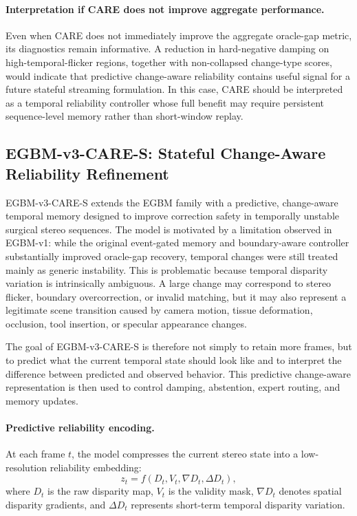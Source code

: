 \documentclass[11pt,a4paper]{article}
\begin{document}
\paragraph{Interpretation if CARE does not improve aggregate performance.}
Even when CARE does not immediately improve the aggregate oracle-gap metric, its
diagnostics remain informative. A reduction in hard-negative damping on
high-temporal-flicker regions, together with non-collapsed change-type scores,
would indicate that predictive change-aware reliability contains useful signal
for a future stateful streaming formulation. In this case, CARE should be
interpreted as a temporal reliability controller whose full benefit may require
persistent sequence-level memory rather than short-window replay.

\subsection{EGBM-v3-CARE-S: Stateful Change-Aware Reliability Refinement}

EGBM-v3-CARE-S extends the EGBM family with a predictive, change-aware
temporal memory designed to improve correction safety in temporally unstable
surgical stereo sequences. The model is motivated by a limitation observed in
EGBM-v1: while the original event-gated memory and boundary-aware controller
substantially improved oracle-gap recovery, temporal changes were still treated
mainly as generic instability. This is problematic because temporal disparity
variation is intrinsically ambiguous. A large change may correspond to stereo
flicker, boundary overcorrection, or invalid matching, but it may also represent
a legitimate scene transition caused by camera motion, tissue deformation,
occlusion, tool insertion, or specular appearance changes.

The goal of EGBM-v3-CARE-S is therefore not simply to retain more frames, but to
predict what the current temporal state should look like and to interpret the
difference between predicted and observed behavior. This predictive
change-aware representation is then used to control damping, abstention, expert
routing, and memory updates.

\paragraph{Predictive reliability encoding.}
At each frame $t$, the model compresses the current stereo state into a
low-resolution reliability embedding:
\begin{equation}
    z_t = f(D_t, V_t, \nabla D_t, \Delta D_t),
\end{equation}
where $D_t$ is the raw disparity map, $V_t$ is the validity mask,
$\nabla D_t$ denotes spatial disparity gradients, and $\Delta D_t$ represents
short-term temporal disparity variation.
\end{document}
